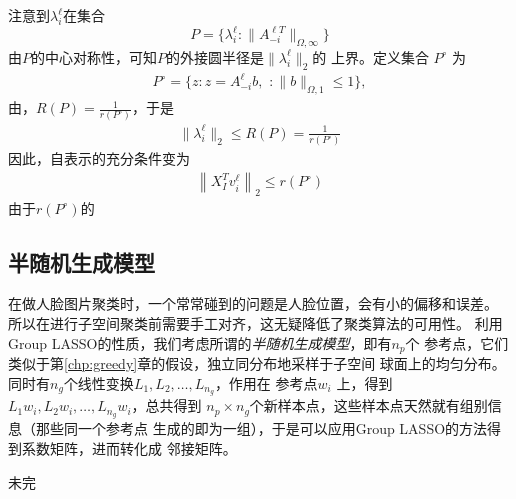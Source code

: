 \documentclass[main.tex]{subfiles}
\begin{document}
注意到$\lambda_i^\ell$在集合
$$P=\{ \lambda_i^\ell: \|A_{-i}^{\ell T}\|_{\Omega,\infty}\}$$
由$P$的中心对称性，可知$P$的外接圆半径是$\|\lambda_i^\ell\|_2$的
上界。定义集合 $P^\circ$ 为 
\begin{align*} 
  P^\circ = \{ z: z = A_{-i}^{\ell} b,\,\, : \|b\|_{\Omega,1} \leq 1\},
\end{align*} 
由\cite{ball1997intro_convex_geometry}，$R(P) = \frac{1}{r(P^\circ)}$，于是
\begin{align*} 
  \|\lambda_i^\ell \|_2 \leq R(P) = \frac{1}{r(P^\circ)}
\end{align*} 
因此，自表示的充分条件变为
\begin{align} 
  \left\|X_{I}^T v_i^\ell \right\|_{2} \leq r(P^\circ)
  \label{eq:cond1}
\end{align}
由于$r(P^\circ)$的
\subsection{半随机生成模型}
在做人脸图片聚类时，一个常常碰到的问题是人脸位置，会有小的偏移和误差。
所以在进行子空间聚类前需要手工对齐，这无疑降低了聚类算法的可用性。
利用Group LASSO的性质，我们考虑所谓的\emph{半随机生成模型}，即有$n_p$个
参考点，它们类似于第\ref{chp:greedy}章的假设，独立同分布地采样于子空间
球面上的均匀分布。同时有$n_g$个线性变换$L_1, L_2,\ldots,L_{n_g}$，作用在
参考点$w_i$ 上，得到$L_1 w_i, L_2 w_i, \ldots, L_{n_g} w_i$，总共得到
$n_p \times n_g$个新样本点，这些样本点天然就有组别信息（那些同一个参考点
生成的即为一组），于是可以应用Group LASSO的方法得到系数矩阵，进而转化成
邻接矩阵。

未完
\end{document}
